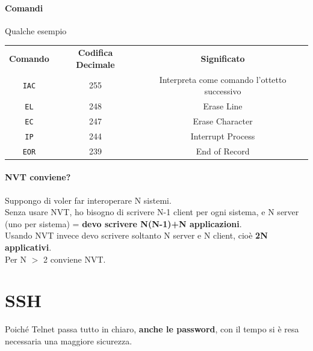 \documentclass[10pt]{article}
\begin{document}
\paragraph{Comandi} Qualche esempio
\begin{center}
\begin{tabular}{c | c c}
\textbf{Comando} & \textbf{Codifica Decimale} & \textbf{Significato} \\
\texttt{IAC} & 255 & Interpreta come comando l'ottetto successivo \\
\texttt{EL} & 248 & Erase Line \\
\texttt{EC} & 247 & Erase Character \\
\texttt{IP} & 244 & Interrupt Process \\
\texttt{EOR} & 239 & End of Record \\
\end{tabular}
\end{center}
\paragraph{NVT conviene?} Suppongo di voler far interoperare N sistemi.\\
Senza usare NVT, ho bisogno di scrivere N-1 client per ogni sistema, e N server (uno per sistema) = \textbf{devo scrivere N(N-1)+N applicazioni}.\\
Usando NVT invece devo scrivere soltanto N server e N client, cioè \textbf{2N applicativi}.\\
Per N $>$ 2 conviene NVT.
\pagebreak
\section{SSH}
Poiché Telnet passa tutto in chiaro, \textbf{anche le password}, con il tempo si è resa necessaria una maggiore sicurezza.
\end{document}
